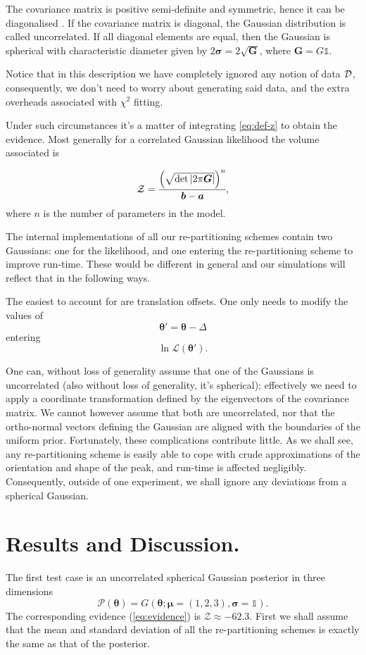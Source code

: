\documentclass[usenatbib]{mnras}
\begin{document}
The covariance matrix is positive semi-definite and symmetric, hence
it can be diagonalised \citep{taboga2017lectures}. If the covariance
matrix is diagonal, the Gaussian distribution is called
uncorrelated. If all diagonal elements are equal, then the Gaussian is
spherical with characteristic diameter given by
\(2\bm{\sigma} = 2\sqrt{\bm{G}}\), where \(\bm{G} = G \mathds{1}\).

Notice that in this description we have completely ignored any notion
of data ${\cal D}$, consequently, we don't need to worry about
generating said data, and the extra overheads associated with
\(\chi^2\) fitting.

Under such circumstances it's a matter of integrating \cref{eq:def-z}
to obtain the evidence. Most generally for a correlated Gaussian
likelihood the volume associated is

\begin{equation}\label{eq:evidence}
   {\cal Z} = \cfrac{{\left( \sqrt{ \det \left| 2\mathrm{\pi} \bm{G} \right|} \right)}^{n}}{\bm{b}-\bm{a}}, 
\end{equation}
where \(n\) is the number of parameters in the model.

The internal implementations of all our re-partitioning schemes
contain two Gaussians: one for the likelihood, and one entering
the re-partitioning scheme to improve run-time. These would be
different in general and our simulations will reflect that in the
following ways.

The easiest to account for are translation offsets. One only needs
to modify the values of \[\bm{\theta}' = \bm{\theta} - \Delta\] entering
\[\ln \mathcal{L}(\bm{\theta}').\]

One can, without loss of generality assume that one of the
Gaussians is uncorrelated (also without loss of generality, it's
spherical); effectively we need to apply a coordinate
transformation defined by the eigenvectors of the covariance
matrix. We cannot however assume that both are uncorrelated, nor
that the ortho-normal vectors defining the Gaussian are aligned
with the boundaries of the uniform prior. Fortunately, these
complications contribute little. As we shall see, any
re-partitioning scheme is easily able to cope with crude
approximations of the orientation and shape of the peak, and
run-time is affected negligibly. Consequently, outside of one
experiment, we shall ignore any deviations from a spherical
Gaussian.


\section{Results and Discussion.}\label{sec:org50493c6}
The first test case is an uncorrelated spherical Gaussian posterior
in three dimensions \[\mathcal{P}(\bm{\theta}) = G(\bm{\theta}; \bm{\mu} =
  (1,2,3),\bm{\sigma} = \mathds{1}).\] The corresponding evidence
(\cref{eq:evidence}) is \(\mathcal{Z}\approx-62.3\). First we shall
assume that the mean and standard deviation of all the
re-partitioning schemes is exactly the same as that of the
posterior.
\end{document}
